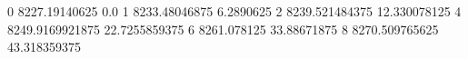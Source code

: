 0 8227.19140625 0.0
1 8233.48046875 6.2890625
2 8239.521484375 12.330078125
4 8249.9169921875 22.7255859375
6 8261.078125 33.88671875
8 8270.509765625 43.318359375
